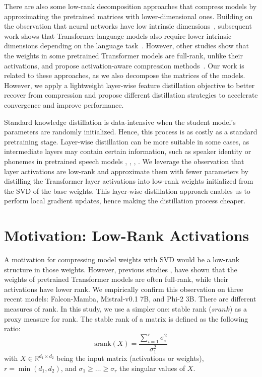 There are also some low-rank decomposition approaches that compress models by approximating the pretrained matrices with lower-dimensional ones. Building on the observation that neural networks have low intrinsic dimensions~\citep{li2018measuring}, subsequent work shows that Transformer language models also require lower intrinsic dimensions depending on the language task~\citep{aghajanyan2020intrinsic}. However, other studies show that the weights in some pretrained Transformer models are full-rank, unlike their activations, and propose activation-aware compression methods~\citep{yu_compressing_2023,chen_drone}. Our work is related to these approaches, as we also decompose the matrices of the models. However, we apply a lightweight layer-wise feature distillation objective to better recover from compression and propose different distillation strategies to accelerate convergence and improve performance.

Standard knowledge distillation is data-intensive when the student model's parameters are randomly initialized. Hence, this process is as costly as a standard pretraining stage. Layer-wise distillation can be more suitable in some cases, as intermediate layers may contain certain information, such as speaker identity or phonemes in pretrained speech models \citep{baevski2020wav2vec20frameworkselfsupervised}, \citep{pasad2022layerwiseanalysisselfsupervisedspeech}, \citep{chang2022distilhubertspeechrepresentationlearning}, \citep{chang2021explorationselfsupervisedpretrainedrepresentations}. We leverage the observation that layer activations are low-rank and approximate them with fewer parameters by distilling the Transformer layer activations into low-rank weights
initialized from the SVD of the base weights. This layer-wise distillation approach
enables us to perform local gradient updates, hence making the distillation process cheaper.

\section{Motivation: Low-Rank Activations}
\label{ssec:srank}
A motivation for compressing model weights with SVD would be a low-rank structure in those weights. However, previous studies \citep{chen_drone}, \citep{yu_compressing_2023} have shown that the weights of pretrained Transformer models are often full-rank, while their activations have lower rank.
We empirically confirm this observation on three recent models: Falcon-Mamba, Mistral-v0.1 7B, and Phi-2 3B. There are different measures of rank. In this study, we use a simpler one: stable rank ($srank$) as a proxy measure for rank. The stable rank of a matrix is defined as the following ratio:
\begin{equation}
\text{srank}(X) = \frac{\sum_{i=1}^{r} \sigma_i^2}{\sigma_1^2}
\end{equation}
with $X \in \mathbb{R}^{d_{1} \times d_{2}}$ being the input matrix (activations or weights), $r = \min(d_{1}, d_{2})$, and $\sigma_1 \geq \dots \geq \sigma_r$ the singular values of $X$.

